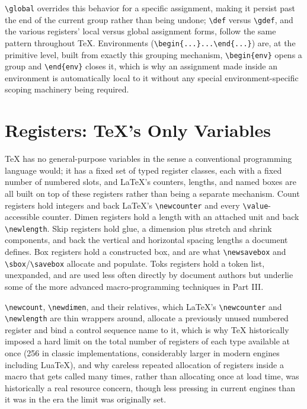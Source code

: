 \texttt{\textbackslash{}global} overrides this behavior for a specific assignment, making it persist past the end of the current group rather than being undone; \texttt{\textbackslash{}def} versus \texttt{\textbackslash{}gdef}, and the various registers' local versus global assignment forms, follow the same pattern throughout TeX. Environments (\texttt{\textbackslash{}begin\{...\}...\textbackslash{}end\{...\}}) are, at the primitive level, built from exactly this grouping mechanism, \texttt{\textbackslash{}begin\{env\}} opens a group and \texttt{\textbackslash{}end\{env\}} closes it, which is why an assignment made inside an environment is automatically local to it without any special environment-specific scoping machinery being required.

\hypertarget{a.5-registers-texs-only-variables}{%
\section{Registers: TeX's Only Variables}\label{a.5-registers-texs-only-variables}}

TeX has no general-purpose variables in the sense a conventional programming language would; it has a fixed set of typed register classes, each with a fixed number of numbered slots, and LaTeX's counters, lengths, and named boxes are all built on top of these registers rather than being a separate mechanism. Count registers hold integers and back LaTeX's \texttt{\textbackslash{}newcounter} and every \texttt{\textbackslash{}value}-accessible counter. Dimen registers hold a length with an attached unit and back \texttt{\textbackslash{}newlength}. Skip registers hold glue, a dimension plus stretch and shrink components, and back the vertical and horizontal spacing lengths a document defines. Box registers hold a constructed box, and are what \texttt{\textbackslash{}newsavebox} and \texttt{\textbackslash{}sbox}/\texttt{\textbackslash{}savebox} allocate and populate. Toks registers hold a token list, unexpanded, and are used less often directly by document authors but underlie some of the more advanced macro-programming techniques in Part III.

\texttt{\textbackslash{}newcount}, \texttt{\textbackslash{}newdimen}, and their relatives, which LaTeX's \texttt{\textbackslash{}newcounter} and \texttt{\textbackslash{}newlength} are thin wrappers around, allocate a previously unused numbered register and bind a control sequence name to it, which is why TeX historically imposed a hard limit on the total number of registers of each type available at once (256 in classic implementations, considerably larger in modern engines including LuaTeX), and why careless repeated allocation of registers inside a macro that gets called many times, rather than allocating once at load time, was historically a real resource concern, though less pressing in current engines than it was in the era the limit was originally set.

